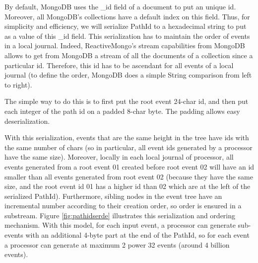 By default, MongoDB uses the \_id field of a document to put an unique id. Moreover, all MongoDB's collections have a default index on this field. Thus,
for simplicity and efficiency, we will serialize PathId to a hexadecimal string to put as a value of this \_id field. This serialization has to maintain the order
of events in a local journal. Indeed, ReactiveMongo's stream capabilities from MongoDB allows to get from MongoDB a stream of all the documents of a collection since a particular id. Therefore, this id has to be ascendant for all events of a local journal (to define the order, MongoDB does a simple String comparison from left to right).

The simple way to do this is to first put the root event 24-char id, and then put each integer of the path id on a padded 8-char byte. The padding allows easy deserialization.

With this serialization, events that are the same height in the tree have ids with the same number of chars (so in particular, all event ids generated by a processor have the same size). Moreover, locally in each local journal of processor, all events generated from a root event 01 created before root event 02 will have an id smaller than all events
generated from root event 02 (because they have the same size, and the root event id 01 has a higher id than 02 which are at the left of the serialized PathId). Furthermore,
sibling nodes in the event tree have an incremental number according to their creation order, so order is ensured in a substream. Figure \ref{fig:pathidserde} illustrates this serialization and ordering mechanism. With this model, for each input event, a processor can generate sub-events with an additional 4-byte part at the end of the PathId, so
for each event a processor can generate at maximum 2 power 32 events (around 4 billion events).

